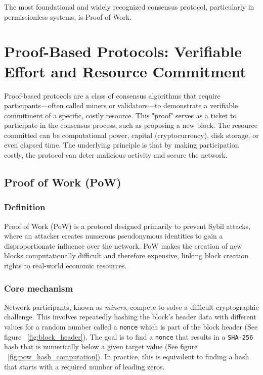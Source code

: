 \documentclass{scrbook}
\begin{document}
The most foundational and widely recognized consensus protocol, particularly in permissionless systems, is Proof of Work.

\chapter{Proof-Based Protocols: Verifiable Effort and Resource Commitment}

Proof-based protocols are a class of consensus algorithms that require participants—often called miners or validators—to demonstrate a verifiable commitment of a specific, costly resource. This "proof" serves as a ticket to participate in the consensus process, such as proposing a new block. The resource committed can be computational power, capital (cryptocurrency), disk storage, or even elapsed time. The underlying principle is that by making participation costly, the protocol can deter malicious activity and secure the network.

\section{Proof of Work (PoW)}

\subsection{Definition}

Proof of Work (PoW) is a protocol designed primarily to prevent Sybil attacks, where an attacker creates numerous pseudonymous identities to gain a disproportionate influence over the network. PoW makes the creation of new blocks computationally difficult and therefore expensive, linking block creation rights to real-world economic resources.

\subsection{Core mechanism}

Network participants, known as \textit{miners}, compete to solve a difficult cryptographic challenge. This involves repeatedly hashing the block's header data with different values for a random number called a \texttt{nonce} which is part of the block header (See figure ~\ref{fig:block_header}). The goal is to find a \texttt{nonce} that results in a \texttt{SHA-256} hash that is numerically below a given target value (See figure ~\ref{fig:pow_hash_computation}). In practice, this is equivalent to finding a hash that starts with a required number of leading zeros.
\end{document}
